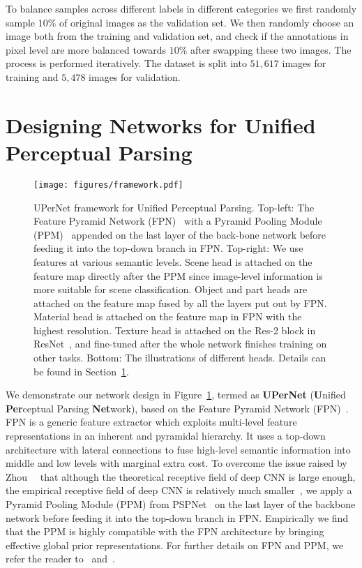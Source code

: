 \documentclass[runningheads]{llncs}
\begin{document}
To balance samples across different labels in different categories we first randomly sample $10\%$ of original images as the validation set. We then randomly choose an image both from the training and validation set, and check if the annotations in pixel level are more balanced towards $10\%$ after swapping these two images. The process is performed iteratively. The dataset is split into $51,617$ images for training and $5,478$ images for validation.

\section{Designing Networks for Unified Perceptual Parsing}
\label{sec:framework}

\begin{figure}[!t]
\centering
\texttt{[image: figures/framework.pdf]}
\caption{UPerNet framework for Unified Perceptual Parsing. Top-left: The Feature Pyramid Network (FPN)~\cite{lin2017feature} with a Pyramid Pooling Module (PPM)~\cite{zhao2017pyramid} appended on the last layer of the back-bone network before feeding it into the top-down branch in FPN. Top-right: We use features at various semantic levels. Scene head is attached on the feature map directly after the PPM since image-level information is more suitable for scene classification. Object and part heads are attached on the feature map fused by all the layers put out by FPN. Material head is attached on the feature map in FPN with the highest resolution. Texture head is attached on the Res-2 block in ResNet~\cite{he2016deep}, and fine-tuned after the whole network finishes training on other tasks. Bottom: The illustrations of different heads. Details can be found in Section~\ref{sec:framework}.}
\label{fig:framework}
\end{figure}

We demonstrate our network design in Figure~\ref{fig:framework}, termed as \textbf{UPerNet} (\textbf{U}nified \textbf{Per}ceptual Parsing \textbf{Net}work), based on the Feature Pyramid Network (FPN)~\cite{lin2017feature}. FPN is a generic feature extractor which exploits multi-level feature representations in an inherent and pyramidal hierarchy. It uses a top-down architecture with lateral connections to fuse high-level semantic information into middle and low levels with marginal extra cost. To overcome the issue raised by Zhou~\etal~ \cite{zhou2014object} that although the theoretical receptive field of deep CNN is large enough, the empirical receptive field of deep CNN is relatively much smaller~\cite{zhou2016learning}, we apply a Pyramid Pooling Module (PPM) from PSPNet~\cite{zhao2017pyramid} on the last layer of the backbone network before feeding it into the top-down branch in FPN. Empirically we find that the PPM is highly compatible with the FPN architecture by bringing effective global prior representations. For further details on FPN and PPM, we refer the reader to~\cite{lin2017feature} and~\cite{zhao2017pyramid}.
\end{document}
